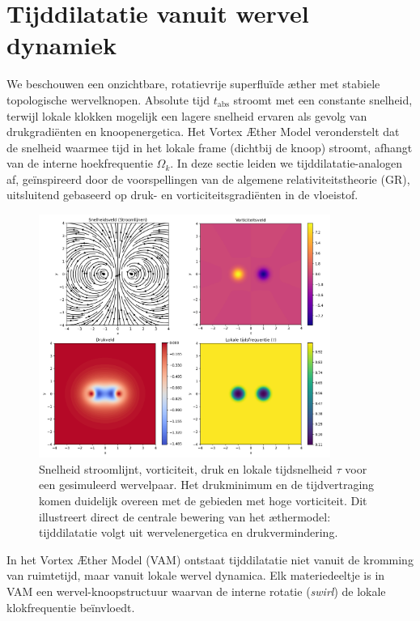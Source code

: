\section{Tijddilatatie vanuit wervel dynamiek}

We beschouwen een onzichtbare, rotatievrije superfluïde æther met stabiele topologische wervelknopen. Absolute tijd $t_\text{abs}$ stroomt met een constante snelheid, terwijl lokale klokken mogelijk een lagere snelheid ervaren als gevolg van drukgradiënten en knoopenergetica. Het Vortex Æther Model veronderstelt dat de snelheid waarmee tijd in het lokale frame (dichtbij de knoop) stroomt, afhangt van de interne hoekfrequentie $\Omega_k$. In deze sectie leiden we tijddilatatie-analogen af, geïnspireerd door de voorspellingen van de algemene relativiteitstheorie (GR), uitsluitend gebaseerd op druk- en vorticiteitsgradiënten in de vloeistof.

\begin{figure}[htbp]
\centering
\includegraphics[width=0.85\textwidth]{01-streamlinesDiPole_nl}
\caption{Snelheid stroomlijnt, vorticiteit, druk en lokale tijdsnelheid $\tau$ voor een gesimuleerd wervelpaar. Het drukminimum en de tijdvertraging komen duidelijk overeen met de gebieden met hoge vorticiteit. Dit illustreert direct de centrale bewering van het æthermodel: tijddilatatie volgt uit wervelenergetica en drukvermindering.}
\label{fig:vortexfields}
\end{figure}

In het Vortex Æther Model (VAM) ontstaat tijddilatatie niet vanuit de kromming van ruimtetijd, maar vanuit lokale wervel dynamica. Elk materiedeeltje is in VAM een wervel-knoopstructuur waarvan de interne rotatie (\textit{swirl}) de lokale klokfrequentie beïnvloedt.

